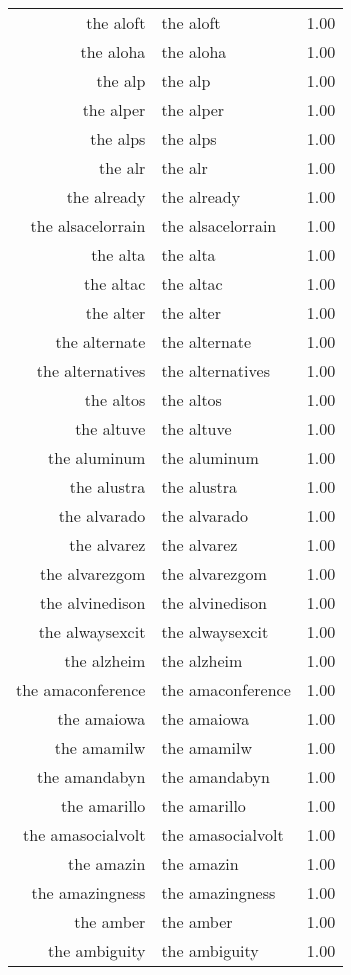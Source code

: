\begin{table}[ht]
\begin{tabular}{rlr}
  the aloft & the aloft & 1.00 \\ 
  the aloha & the aloha & 1.00 \\ 
  the alp & the alp & 1.00 \\ 
  the alper & the alper & 1.00 \\ 
  the alps & the alps & 1.00 \\ 
  the alr & the alr & 1.00 \\ 
  the already & the already & 1.00 \\ 
  the alsacelorrain & the alsacelorrain & 1.00 \\ 
  the alta & the alta & 1.00 \\ 
  the altac & the altac & 1.00 \\ 
  the alter & the alter & 1.00 \\ 
  the alternate & the alternate & 1.00 \\ 
  the alternatives & the alternatives & 1.00 \\ 
  the altos & the altos & 1.00 \\ 
  the altuve & the altuve & 1.00 \\ 
  the aluminum & the aluminum & 1.00 \\ 
  the alustra & the alustra & 1.00 \\ 
  the alvarado & the alvarado & 1.00 \\ 
  the alvarez & the alvarez & 1.00 \\ 
  the alvarezgom & the alvarezgom & 1.00 \\ 
  the alvinedison & the alvinedison & 1.00 \\ 
  the alwaysexcit & the alwaysexcit & 1.00 \\ 
  the alzheim & the alzheim & 1.00 \\ 
  the amaconference & the amaconference & 1.00 \\ 
  the amaiowa & the amaiowa & 1.00 \\ 
  the amamilw & the amamilw & 1.00 \\ 
  the amandabyn & the amandabyn & 1.00 \\ 
  the amarillo & the amarillo & 1.00 \\ 
  the amasocialvolt & the amasocialvolt & 1.00 \\ 
  the amazin & the amazin & 1.00 \\ 
  the amazingness & the amazingness & 1.00 \\ 
  the amber & the amber & 1.00 \\ 
  the ambiguity & the ambiguity & 1.00 \\ 

\end{tabular}
\end{table}
